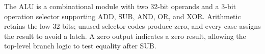 The ALU is a combinational module with two 32-bit operands and a 3-bit
operation selector supporting ADD, SUB, AND, OR, and XOR. Arithmetic
retains the low 32 bits; unused selector codes produce zero, and every
case assigns the result to avoid a latch. A zero output indicates a zero
result, allowing the top-level branch logic to test equality after SUB.
